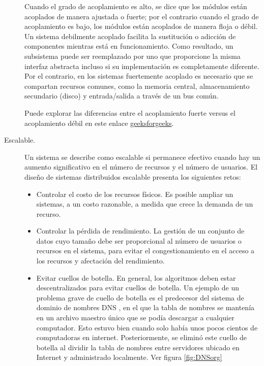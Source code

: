 \begin{description}
		
		
		 Cuando el grado de acoplamiento es alto, se dice que los módulos están acoplados de manera ajustada o fuerte; por el contrario cuando el grado de acoplamiento es bajo, los módulos están acoplados de manera floja o débil.
		Un sistema \gls{debilmente acoplado} facilita la sustitución o adicción de componentes  mientras  está en funcionamiento. Como resultado, un subsistema puede ser reemplazado por uno que proporcione la misma interfaz abstracta incluso si su implementación es completamente diferente. 		
		Por el contrario, en  los sistemas  \gls{fuertemente acoplado} es necesario que se compartan recursos comunes, como la memoria central, almacenamiento secundario (disco) y entrada/salida a través de un bus común. 
		
			
		\begin{tcolorbox}
			[colback=red!5!white,colframe=red!75!black,fonttitle=\bfseries,title=Acoplamiento débil vs fuerte]
			Puede explorar las	diferencias entre el acoplamiento fuerte versus el acoplamiento débil   en este enlace 	\href{https://www.geeksforgeeks.org/difference-between-loosely-coupled-and-tightly-coupled-multiprocessor-system/} {geeksforgeeks}.
		\end{tcolorbox}
		
		 
		
		
		\item[{Escalable.}]   Un sistema se describe como escalable  si permanece efectivo cuando hay un aumento significativo en el número de recursos y el número de usuarios. El diseño de sistemas distribuidos escalable presenta los siguientes retos:		
		\begin{itemize}			
			\item {Controlar el costo de los recursos físicos}.
			 Es posible ampliar un sistemas, a un costo razonable, a medida que crece la demanda de un recurso.
			
			\item {Controlar la pérdida de rendimiento}. 
			La gestión de un conjunto de datos cuyo tamaño debe ser proporcional al número de usuarios o recursos en el sistema, para evitar el congestionamiento en el acceso a los recursos y afectación del rendimiento.
			
			\item { Evitar cuellos de botella}.
			 En general, los algoritmos deben estar descentralizados para evitar cuellos de botella. Un ejemplo de un problema grave de cuello de botella es el  predecesor del sistema de dominio de nombres \gls{DNS} , en el que la tabla de nombres se mantenía en un archivo maestro único que se podía descargar a cualquier computador. Esto estuvo bien cuando solo había unos pocos cientos de computadoras en internet. Posteriormente,  se eliminó este cuello de botella al dividir la tabla de nombres entre servidores ubicado en Internet y administrado localmente. Ver figura \ref{fig:DNSorg} 
			

\end{itemize}
\end{description}
